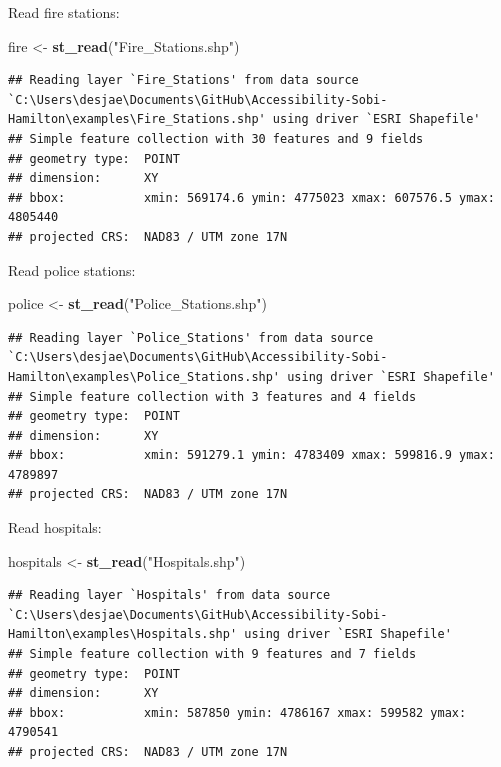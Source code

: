 \documentclass[
]{article}
\newenvironment{Shaded}{\begin{snugshade}}{\end{snugshade}}
\newcommand{\KeywordTok}[1]{\textcolor[rgb]{0.13,0.29,0.53}{\textbf{#1}}}
\newcommand{\NormalTok}[1]{#1}
\newcommand{\StringTok}[1]{\textcolor[rgb]{0.31,0.60,0.02}{#1}}
\begin{document}
Read fire stations:

\begin{Shaded}
\begin{Highlighting}[]
\NormalTok{fire <-}\StringTok{ }\KeywordTok{st_read}\NormalTok{(}\StringTok{"Fire_Stations.shp"}\NormalTok{)}
\end{Highlighting}
\end{Shaded}

\begin{verbatim}
## Reading layer `Fire_Stations' from data source `C:\Users\desjae\Documents\GitHub\Accessibility-Sobi-Hamilton\examples\Fire_Stations.shp' using driver `ESRI Shapefile'
## Simple feature collection with 30 features and 9 fields
## geometry type:  POINT
## dimension:      XY
## bbox:           xmin: 569174.6 ymin: 4775023 xmax: 607576.5 ymax: 4805440
## projected CRS:  NAD83 / UTM zone 17N
\end{verbatim}

Read police stations:

\begin{Shaded}
\begin{Highlighting}[]
\NormalTok{police <-}\StringTok{ }\KeywordTok{st_read}\NormalTok{(}\StringTok{"Police_Stations.shp"}\NormalTok{)}
\end{Highlighting}
\end{Shaded}

\begin{verbatim}
## Reading layer `Police_Stations' from data source `C:\Users\desjae\Documents\GitHub\Accessibility-Sobi-Hamilton\examples\Police_Stations.shp' using driver `ESRI Shapefile'
## Simple feature collection with 3 features and 4 fields
## geometry type:  POINT
## dimension:      XY
## bbox:           xmin: 591279.1 ymin: 4783409 xmax: 599816.9 ymax: 4789897
## projected CRS:  NAD83 / UTM zone 17N
\end{verbatim}

Read hospitals:

\begin{Shaded}
\begin{Highlighting}[]
\NormalTok{hospitals <-}\StringTok{ }\KeywordTok{st_read}\NormalTok{(}\StringTok{"Hospitals.shp"}\NormalTok{)}
\end{Highlighting}
\end{Shaded}

\begin{verbatim}
## Reading layer `Hospitals' from data source `C:\Users\desjae\Documents\GitHub\Accessibility-Sobi-Hamilton\examples\Hospitals.shp' using driver `ESRI Shapefile'
## Simple feature collection with 9 features and 7 fields
## geometry type:  POINT
## dimension:      XY
## bbox:           xmin: 587850 ymin: 4786167 xmax: 599582 ymax: 4790541
## projected CRS:  NAD83 / UTM zone 17N
\end{verbatim}
\end{document}

